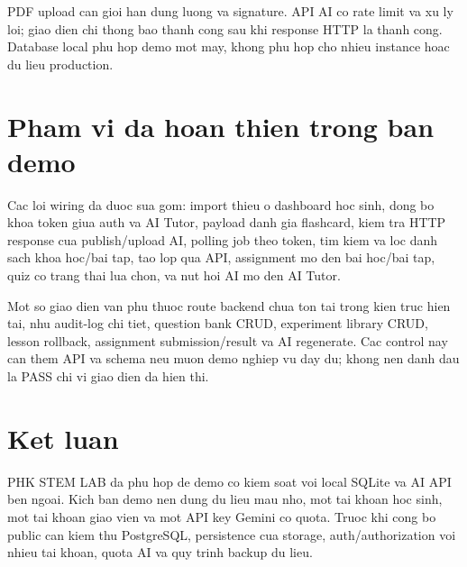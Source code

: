 \documentclass[12pt,a4paper]{article}
\begin{document}
PDF upload can gioi han dung luong va signature. API AI co rate limit va xu ly loi; giao dien chi thong bao thanh cong sau khi response HTTP la thanh cong. Database local phu hop demo mot may, khong phu hop cho nhieu instance hoac du lieu production.

\section{Pham vi da hoan thien trong ban demo}
Cac loi wiring da duoc sua gom: import thieu o dashboard hoc sinh, dong bo khoa token giua auth va AI Tutor, payload danh gia flashcard, kiem tra HTTP response cua publish/upload AI, polling job theo token, tim kiem va loc danh sach khoa hoc/bai tap, tao lop qua API, assignment mo den bai hoc/bai tap, quiz co trang thai lua chon, va nut hoi AI mo den AI Tutor.

Mot so giao dien van phu thuoc route backend chua ton tai trong kien truc hien tai, nhu audit-log chi tiet, question bank CRUD, experiment library CRUD, lesson rollback, assignment submission/result va AI regenerate. Cac control nay can them API va schema neu muon demo nghiep vu day du; khong nen danh dau la PASS chi vi giao dien da hien thi.

\section{Ket luan}
PHK STEM LAB da phu hop de demo co kiem soat voi local SQLite va AI API ben ngoai. Kich ban demo nen dung du lieu mau nho, mot tai khoan hoc sinh, mot tai khoan giao vien va mot API key Gemini co quota. Truoc khi cong bo public can kiem thu PostgreSQL, persistence cua storage, auth/authorization voi nhieu tai khoan, quota AI va quy trinh backup du lieu.
\end{document}
